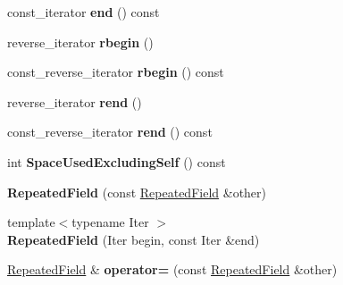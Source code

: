 \begin{DoxyCompactItemize}
const\+\_\+iterator {\bfseries end} () const
\item 
\mbox{\label{classgoogle_1_1protobuf_1_1RepeatedField_a7714b4364a0afd79059e22bab7295b7e}} 
reverse\+\_\+iterator {\bfseries rbegin} ()
\item 
\mbox{\label{classgoogle_1_1protobuf_1_1RepeatedField_a241821900a2c5642c299c4923ac8e97c}} 
const\+\_\+reverse\+\_\+iterator {\bfseries rbegin} () const
\item 
\mbox{\label{classgoogle_1_1protobuf_1_1RepeatedField_a27356716a1e9b3b891a9de1478e84409}} 
reverse\+\_\+iterator {\bfseries rend} ()
\item 
\mbox{\label{classgoogle_1_1protobuf_1_1RepeatedField_a5e5b42cff6fc4276259b610115ca67ab}} 
const\+\_\+reverse\+\_\+iterator {\bfseries rend} () const
\item 
\mbox{\label{classgoogle_1_1protobuf_1_1RepeatedField_aa9b8f4ba82713cfd9e34e691b981143b}} 
int {\bfseries Space\+Used\+Excluding\+Self} () const
\item 
\mbox{\label{classgoogle_1_1protobuf_1_1RepeatedField_aff2fa0319619050ca4c6d887bec29efc}} 
{\bfseries Repeated\+Field} (const \hyperlink{classgoogle_1_1protobuf_1_1RepeatedField}{Repeated\+Field} \&other)
\item 
\mbox{\label{classgoogle_1_1protobuf_1_1RepeatedField_a54f1f838c1c4025d57928092238bc041}} 
{\footnotesize template$<$typename Iter $>$ }\\{\bfseries Repeated\+Field} (Iter begin, const Iter \&end)
\item 
\mbox{\label{classgoogle_1_1protobuf_1_1RepeatedField_a32c6766a25d8f5909836c64da7fee651}} 
\hyperlink{classgoogle_1_1protobuf_1_1RepeatedField}{Repeated\+Field} \& {\bfseries operator=} (const \hyperlink{classgoogle_1_1protobuf_1_1RepeatedField}{Repeated\+Field} \&other)
\item 

\end{DoxyCompactItemize}
